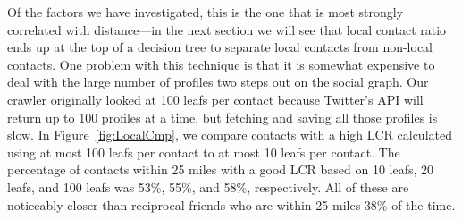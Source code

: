 Of the factors we have investigated, this is the one that is most strongly
correlated with distance---in the next section we will see that local contact
ratio ends up at the top of a decision tree to separate local contacts from
non-local contacts.
%
One problem with this technique is that it is somewhat expensive to deal with
the large number of profiles two steps out on the social graph.
%
Our crawler originally looked at 100 leafs per contact because Twitter's API
will return up to 100 profiles at a time, but fetching and saving all those
profiles is slow.
%
In Figure~\ref{fig:LocalCmp}, we compare contacts with a high LCR calculated
using at most 100 leafs per contact to at most 10 leafs per contact.
%
The percentage of contacts within 25 miles with a good LCR based on 10 leafs,
20 leafs, and 100 leafs was 53\%, 55\%, and 58\%, respectively.
%
All of these are noticeably closer than reciprocal friends who are within 25
miles 38\% of the time.

